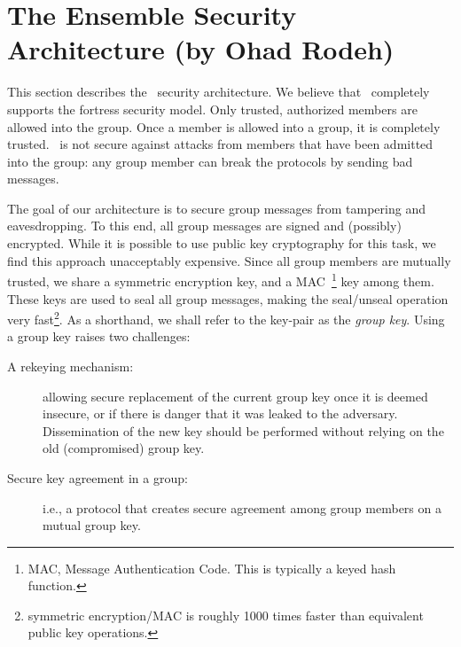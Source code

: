 %
%
%
\section{The Ensemble Security Architecture (by Ohad Rodeh)}

This section describes the \ensemble\ security architecture. We
believe that \ensemble\ completely supports the fortress security
model. Only trusted, authorized members are allowed into the group.
Once a member is allowed into a group, it is completely trusted.
\ensemble\ is not secure against attacks from members that have been
admitted into the group: any group member can break the protocols by
sending bad messages.

The goal of our architecture is to secure group messages from
tampering and eavesdropping. To this end, all group messages are
signed and (possibly) encrypted. While it is possible to use public
key cryptography for this task, we find this approach unacceptably
expensive. Since all group members are mutually trusted, we share a
symmetric encryption key, and a MAC~\footnote{MAC, Message Authentication
Code. This is typically a keyed hash function.} key among them. These
keys are used to seal all group messages, making the seal/unseal
operation very fast\footnote{symmetric encryption/MAC is roughly 1000
times faster than equivalent public key operations.}. As a shorthand,
we shall refer to the key-pair as the {\it group key}. Using a group key
raises two challenges:

\begin{description}
\item[ A rekeying mechanism:] allowing secure replacement of the current
group key once it is deemed insecure, or if there is danger that it
was leaked to the adversary. Dissemination of the new key should be
performed without relying on the old (compromised) group key.

\item[Secure key agreement in a group:] i.e., a protocol that creates
secure agreement among group members on a mutual group key. 
\end{description}


